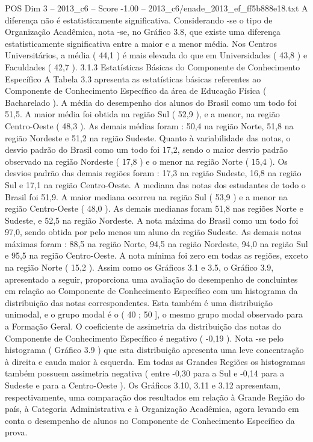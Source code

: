 \begin{textsample}{POS Dim 3 – 2013\_c6 – Score -1.00 – 2013\_c6/enade\_2013\_ef\_ff5b888e18.txt}
A diferença não é estatisticamente significativa.
Considerando -se o tipo de Organização Acadêmica, nota -se, no Gráfico 3.8, que existe uma diferença estatisticamente significativa entre a maior e a menor média.
Nos Centros Universitários, a média ( 44,1 ) é mais elevada do que em Universidades ( 43,8 ) e Faculdades ( 42,7 ). 3.1.3 Estatísticas Básicas do Componente de Conhecimento Específico A Tabela 3.3 apresenta as estatísticas básicas referentes ao Componente de Conhecimento Específico da área de Educação Física ( Bacharelado ).
A média do desempenho dos alunos do Brasil como um todo foi 51,5.
A maior média foi obtida na região Sul ( 52,9 ), e a menor, na região Centro-Oeste ( 48,3 ).
As demais médias foram : 50,4 na região Norte, 51,8 na região Nordeste e 51,2 na região Sudeste.
Quanto à variabilidade das notas, o desvio padrão do Brasil como um todo foi 17,2, sendo o maior desvio padrão observado na região Nordeste ( 17,8 ) e o menor na região Norte ( 15,4 ).
Os desvios padrão das demais regiões foram : 17,3 na região Sudeste, 16,8 na região Sul e 17,1 na região Centro-Oeste.
A mediana das notas dos estudantes de todo o Brasil foi 51,9.
A maior mediana ocorreu na região Sul ( 53,9 ) e a menor na região Centro-Oeste ( 48,0 ).
As demais medianas foram 51,8 nas regiões Norte e Sudeste, e 52,5 na região Nordeste.
A nota máxima do Brasil como um todo foi 97,0, sendo obtida por pelo menos um aluno da região Sudeste.
As demais notas máximas foram : 88,5 na região Norte, 94,5 na região Nordeste, 94,0 na região Sul e 95,5 na região Centro-Oeste.
A nota mínima foi zero em todas as regiões, exceto na região Norte ( 15,2 ).
Assim como os Gráficos 3.1 e 3.5, o Gráfico 3.9, apresentado a seguir, proporciona uma avaliação do desempenho de concluintes em relação ao Componente de Conhecimento Específico com um histograma da distribuição das notas correspondentes.
Esta também é uma distribuição unimodal, e o grupo modal é o ( 40 ; 50 ], o mesmo grupo modal observado para a Formação Geral.
O coeficiente de assimetria da distribuição das notas do Componente de Conhecimento Específico é negativo ( -0,19 ).
Nota -se pelo histograma ( Gráfico 3.9 ) que esta distribuição apresenta uma leve concentração à direita e cauda maior à esquerda.
Em todas as Grandes Regiões os histogramas também possuem assimetria negativa ( entre -0,30 para a Sul e -0,14 para a Sudeste e para a Centro-Oeste ).
Os Gráficos 3.10, 3.11 e 3.12 apresentam, respectivamente, uma comparação dos resultados em relação à Grande Região do país, à Categoria Administrativa e à Organização Acadêmica, agora levando em conta o desempenho de alunos no Componente de Conhecimento Específico da prova.

\end{textsample}
